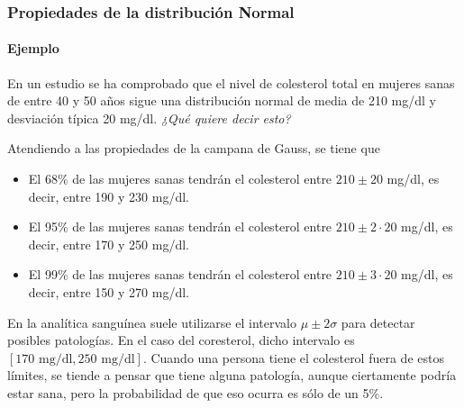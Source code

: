 \begin{frame}
\frametitle{Propiedades de la distribución Normal}
\framesubtitle{Ejemplo}
En un estudio se ha comprobado que el nivel de colesterol total en mujeres
sanas de entre 40 y 50 años sigue una distribución normal de media de 210 mg/dl y desviación
típica 20 mg/dl. 
\emph{¿Qué quiere decir esto?}

Atendiendo a las propiedades de la campana de Gauss, se tiene que 
\begin{itemize}
\item El 68\% de las mujeres sanas tendrán el colesterol entre $210\pm 20$ mg/dl, es decir, entre 190 y 230 mg/dl.
\item El 95\% de las mujeres sanas tendrán el colesterol entre $210\pm 2\cdot 20$ mg/dl, es decir, entre 170 y 250
mg/dl.
\item El 99\% de las mujeres sanas tendrán el colesterol entre $210\pm 3\cdot 20$ mg/dl, es decir, entre 150 y 270
mg/dl.
\end{itemize}

En la analítica sanguínea suele utilizarse el intervalo $\mu\pm 2\sigma$ para detectar posibles patologías. En el caso
del coresterol, dicho intervalo es $[170\text{ mg/dl}, 250\text{ mg/dl}]$. Cuando una persona tiene el colesterol fuera
de estos límites, se tiende a pensar que tiene alguna patología, aunque ciertamente podría estar sana, pero la
probabilidad de que eso ocurra es sólo de un 5\%.

\end{frame}


